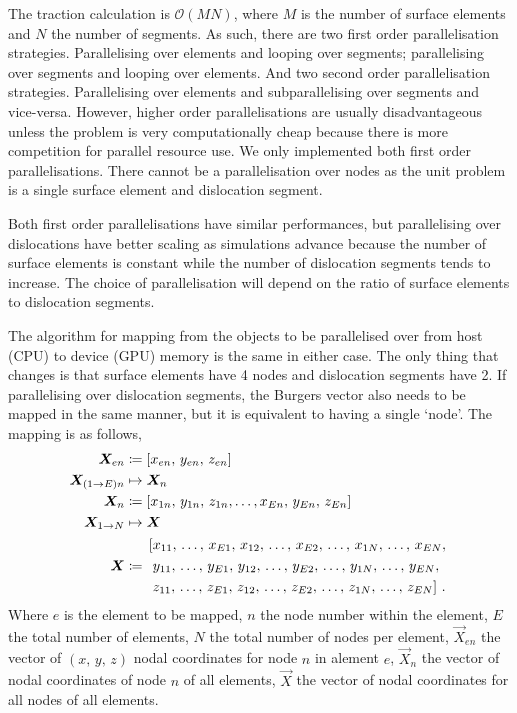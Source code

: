 The traction calculation is $\mathcal{O}(MN)$, where $M$ is the number of surface elements and $N$
the number of segments. As such, there are two first order parallelisation strategies. Parallelising over elements and looping over segments; parallelising over segments and looping over elements. And two second order parallelisation strategies. Parallelising over elements and subparallelising over segments and vice-versa. However, higher order parallelisations are usually disadvantageous unless the problem is very computationally cheap because there is more competition for parallel resource use. We only implemented both first order parallelisations. There cannot be a parallelisation over nodes as the unit problem is a single surface element and dislocation segment.

Both first order parallelisations have similar performances, but parallelising over dislocations have better scaling as simulations advance because the number of surface elements is constant while the number of dislocation segments tends to increase. The choice of parallelisation will depend on the ratio of surface elements to dislocation segments.

The algorithm for mapping from the objects to be parallelised over from host (CPU) to device (GPU) memory is the same in either case. The only thing that changes is that surface elements have 4 nodes and dislocation segments have 2. If parallelising over dislocation segments, the Burgers vector also needs to be mapped in the same manner, but it is equivalent to having a single `node'. The mapping is as follows,
\begin{subequations}\label{eq:hostDeviceElementMap}
  \begin{align}
    \vec{X}_{en}        & \coloneqq	\left[x_{en},\, y_{en},\, z_{en}\right]                                                     \\
    \vec{X}_{(1\to E)n} & \mapsto 	\vec{X}_{n} \nn
    \vec{X}_{n}         & \coloneqq	\left[x_{1n},\, y_{1n},\, z_{1n},\ldots,x_{En},\, y_{En},\, z_{En}\right]\label{seq:xn_arr} \\
    \vec{X}_{1\to N}    & \mapsto	\vec{X}\nn
    \vec{X}             & \coloneqq
    \begin{aligned}
       & \left[x_{11},\, \ldots,\, x_{E1},\, x_{12},\, \ldots,\, x_{E2},\, \ldots,\, x_{1N},\, \ldots,\, x_{EN}, \right.      \\
       & \left.\,y_{11},\, \ldots,\, y_{E1},\, y_{12},\, \ldots,\, y_{E2},\, \ldots,\, y_{1N},\, \ldots,\, y_{EN}, \right.    \\
       & \left.\,z_{11},\, \ldots,\, z_{E1},\, z_{12},\, \ldots,\, z_{E2},\, \ldots,\, z_{1N},\, \ldots,\, z_{EN}  \right]\,.
    \end{aligned}
  \end{align}
\end{subequations}
Where $ e $ is the element to be mapped, $ n $ the node number within the element, $ E $ the total number of elements, $N$ the total number of nodes per element, $\vec{X}_{en}$ the vector of $(x,\,y,\,z)$ nodal coordinates for node $n$ in alement $e$, $\vec{X}_n$ the vector of nodal coordinates of node $n$ of all elements, $\vec{X}$ the vector of nodal coordinates for all nodes of all elements.

